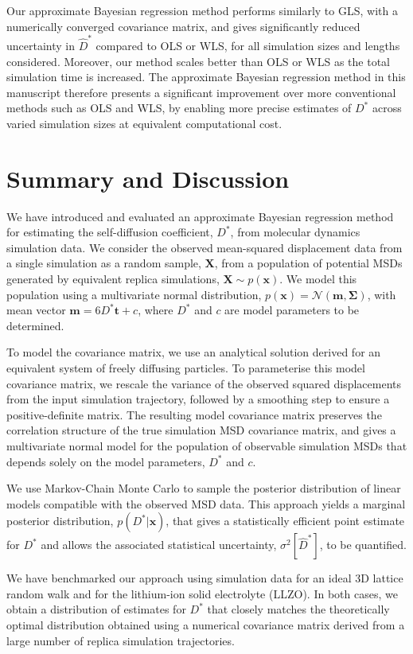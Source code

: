\documentclass[reprint,superscriptaddress,nobibnotes,amsmath,amssymb,aps,prx,hidelinks,linenumbers]{revtex4-2}
\newcommand{\oMSD}{\ensuremath{\bm{x}}}
\newcommand{\model}{\bm{m}}
\newcommand{\prob}[1]{\ensuremath{p(#1)}}
\newcommand{\Dest}{\ensuremath{\widehat{D}^*}}
\newcommand{\D}{\ensuremath{D^*}}
\newcommand{\var}[1]{\ensuremath{\sigma^2[#1]}}
\begin{document}
Our approximate Bayesian regression method performs similarly to GLS, with a numerically converged covariance matrix, and gives significantly reduced uncertainty in $\Dest$ compared to OLS or WLS, for all simulation sizes and lengths considered.
Moreover, our method scales better than OLS or WLS as the total simulation time is increased.
The approximate Bayesian regression method in this manuscript therefore presents a significant improvement over more conventional methods such as OLS and WLS, by enabling more precise estimates of $\D$ across varied simulation sizes at equivalent computational cost.

\section{Summary and Discussion}

We have introduced and evaluated an approximate Bayesian regression method for estimating the self-diffusion coefficient, $\D$, from molecular dynamics simulation data.
We consider the observed mean-squared displacement data from a single simulation as a random sample, $\bm{X}$, from a population of potential MSDs generated by equivalent replica simulations, $\bm{X}\sim p(\oMSD)$.
We model this population using a multivariate normal distribution, $p(\oMSD) = \mathcal{N}(\model, \mathbf{\Sigma})$, with mean vector $\model = 6\D\bm{t} + c$, where $\D$ and $c$ are model parameters to be determined.

To model the covariance matrix, we use an analytical solution derived for an equivalent system of freely diffusing particles.
To parameterise this model covariance matrix, we rescale the variance of the observed squared displacements from the input simulation trajectory, followed by a smoothing step to ensure a positive-definite matrix.
The resulting model covariance matrix preserves the correlation structure of the true simulation MSD covariance matrix, and gives a multivariate normal model for the population of observable simulation MSDs that depends solely on the model parameters, $\D$ and $c$.

We use Markov-Chain Monte Carlo to sample the posterior distribution of linear models compatible with the observed MSD data.
This approach yields a marginal posterior distribution, $\prob{\D | \oMSD}$, that gives a statistically efficient point estimate for $\D$ and allows the associated statistical uncertainty, $\var{\Dest}$, to be quantified.

We have benchmarked our approach using simulation data for an ideal 3D lattice random walk and for the lithium-ion solid electrolyte  (LLZO).
In both cases, we obtain a distribution of estimates for $\D$ that closely matches the theoretically optimal distribution obtained using a numerical covariance matrix derived from a large number of replica simulation trajectories.
\end{document}
